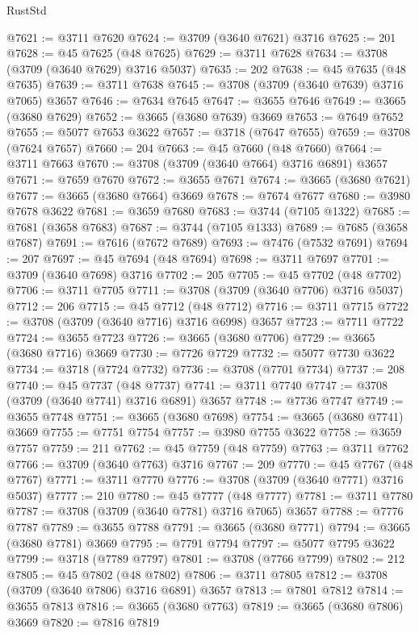 \begin{lexlean}{RustStd}
\begin{coremodule}
@7621 := @3711 @7620
@7624 := @3709 (@3640 @7621) @3716
@7625 := 201
@7628 := @45 @7625 (@48 @7625)
@7629 := @3711 @7628
@7634 := @3708 (@3709 (@3640 @7629) @3716 @5037)
@7635 := 202
@7638 := @45 @7635 (@48 @7635)
@7639 := @3711 @7638
@7645 := @3708 (@3709 (@3640 @7639) @3716 @7065) @3657
@7646 := @7634 @7645
@7647 := @3655 @7646
@7649 := @3665 (@3680 @7629)
@7652 := @3665 (@3680 @7639) @3669
@7653 := @7649 @7652
@7655 := @5077 @7653 @3622
@7657 := @3718 (@7647 @7655)
@7659 := @3708 (@7624 @7657)
@7660 := 204
@7663 := @45 @7660 (@48 @7660)
@7664 := @3711 @7663
@7670 := @3708 (@3709 (@3640 @7664) @3716 @6891) @3657
@7671 := @7659 @7670
@7672 := @3655 @7671
@7674 := @3665 (@3680 @7621)
@7677 := @3665 (@3680 @7664) @3669
@7678 := @7674 @7677
@7680 := @3980 @7678 @3622
@7681 := @3659 @7680
@7683 := @3744 (@7105 @1322)
@7685 := @7681 (@3658 @7683)
@7687 := @3744 (@7105 @1333)
@7689 := @7685 (@3658 @7687)
@7691 := @7616 (@7672 @7689)
@7693 := @7476 (@7532 @7691)
@7694 := 207
@7697 := @45 @7694 (@48 @7694)
@7698 := @3711 @7697
@7701 := @3709 (@3640 @7698) @3716
@7702 := 205
@7705 := @45 @7702 (@48 @7702)
@7706 := @3711 @7705
@7711 := @3708 (@3709 (@3640 @7706) @3716 @5037)
@7712 := 206
@7715 := @45 @7712 (@48 @7712)
@7716 := @3711 @7715
@7722 := @3708 (@3709 (@3640 @7716) @3716 @6998) @3657
@7723 := @7711 @7722
@7724 := @3655 @7723
@7726 := @3665 (@3680 @7706)
@7729 := @3665 (@3680 @7716) @3669
@7730 := @7726 @7729
@7732 := @5077 @7730 @3622
@7734 := @3718 (@7724 @7732)
@7736 := @3708 (@7701 @7734)
@7737 := 208
@7740 := @45 @7737 (@48 @7737)
@7741 := @3711 @7740
@7747 := @3708 (@3709 (@3640 @7741) @3716 @6891) @3657
@7748 := @7736 @7747
@7749 := @3655 @7748
@7751 := @3665 (@3680 @7698)
@7754 := @3665 (@3680 @7741) @3669
@7755 := @7751 @7754
@7757 := @3980 @7755 @3622
@7758 := @3659 @7757
@7759 := 211
@7762 := @45 @7759 (@48 @7759)
@7763 := @3711 @7762
@7766 := @3709 (@3640 @7763) @3716
@7767 := 209
@7770 := @45 @7767 (@48 @7767)
@7771 := @3711 @7770
@7776 := @3708 (@3709 (@3640 @7771) @3716 @5037)
@7777 := 210
@7780 := @45 @7777 (@48 @7777)
@7781 := @3711 @7780
@7787 := @3708 (@3709 (@3640 @7781) @3716 @7065) @3657
@7788 := @7776 @7787
@7789 := @3655 @7788
@7791 := @3665 (@3680 @7771)
@7794 := @3665 (@3680 @7781) @3669
@7795 := @7791 @7794
@7797 := @5077 @7795 @3622
@7799 := @3718 (@7789 @7797)
@7801 := @3708 (@7766 @7799)
@7802 := 212
@7805 := @45 @7802 (@48 @7802)
@7806 := @3711 @7805
@7812 := @3708 (@3709 (@3640 @7806) @3716 @6891) @3657
@7813 := @7801 @7812
@7814 := @3655 @7813
@7816 := @3665 (@3680 @7763)
@7819 := @3665 (@3680 @7806) @3669
@7820 := @7816 @7819

\end{coremodule}
\end{lexlean}
